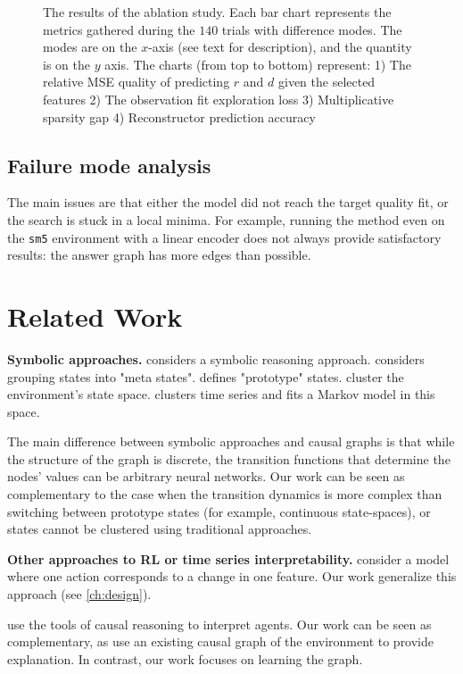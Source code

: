 \documentclass[a4paper,11pt,oneside]{report}
\begin{document}
\begin{figure}
    \caption{The results of the ablation study. Each bar chart represents the metrics gathered during the $140$ trials with difference modes. The modes are on the $x$-axis (see text for description), and the quantity is on the $y$ axis. The charts (from top to bottom) represent: 1) The relative MSE quality of predicting $r$ and $d$ given the selected features 2) The observation fit exploration loss 3) Multiplicative sparsity gap 4) Reconstructor prediction accuracy}
    \label{fig:ablationve2fitadd}
\end{figure}


\section{Failure mode analysis}
The main issues are that either the model did not reach the target quality fit, or the search is stuck in a local minima. For example, running the method even on the {\tt sm5} environment with a linear encoder does not always provide satisfactory results: the answer graph has more edges than possible.

\chapter{Related Work}
\label{ch:related_work}

{\bf Symbolic approaches.}
 \cite{Ave, DesJardins1993,Evans2018} considers a symbolic reasoning approach. \cite{Jonsson2006} considers grouping states into "meta states". \cite{Corneil2018} defines "prototype" states.
 \cite{Yarats2016} cluster the environment's state space.
 \cite{Fortuin2018} clusters time series and fits a Markov model in this space.

The main difference between symbolic approaches and causal graphs is that while the structure of the graph is discrete, the transition functions that determine the nodes' values can be arbitrary neural networks. Our work can be seen as complementary to the case when the transition dynamics is more complex than switching between prototype states (for example, continuous state-spaces), or states cannot be clustered using traditional approaches.

{\bf Other approaches to RL or time series interpretability.}
 \cite{Thomas2018} consider a model where one action corresponds to a change in one feature. Our work generalize this approach (see \autoref{ch:design}).

 \cite{Everitt2019,Martic2020,Madumal2019} use the tools of causal reasoning to interpret agents. Our work can be seen as complementary, as \cite{Everitt2019,Martic2020,Madumal2019} use an existing causal graph of the environment to provide explanation. In contrast, our work focuses on learning the graph.
\end{document}
